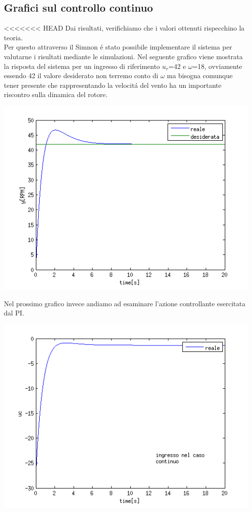 \documentclass[a4paper,13pt]{article}
\begin{document}
\subsection{Grafici sul controllo continuo}
<<<<<<< HEAD
Dai risultati, verifichiamo che i valori ottenuti rispecchino la teoria. \\
Per questo attraverso il Simnon \'e stato possibile implementare il sistema per valutarne i risultati mediante le simulazioni.
Nel seguente grafico viene mostrata la risposta del sistema per un ingresso di riferimento $u_r$=42 e
$\omega$=18, ovviamente essendo 42 il valore desiderato non terremo conto di $\omega$ ma bisogna comunque
tener presente che rappresentando la velocit\'a del vento ha un importante riscontro sulla dinamica del 
rotore.
\begin{center}
\includegraphics[scale=0.6]{graph/ycont.png}
\end{center}
Nel prossimo grafico invece andiamo ad esaminare l'azione controllante esercitata dal PI. 
\begin{center}
\includegraphics[scale=0.6]{graph/ucont.png}
\end{center}
\end{document}
